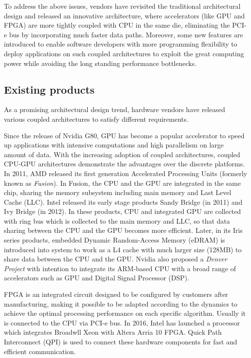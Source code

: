 To address the above issues, vendors have revisited the traditional architectural design and released an innovative architecture, where accelerators (like GPU and FPGA) are more tightly coupled with CPU in the same die, eliminating the PCI-e bus by incorporating much faster data paths. Moreover, some new features are introduced to enable software developers with more programming flexibility to deploy applications on such coupled architectures to exploit the great computing power while avoiding the long standing performance bottlenecks.

\subsection{Existing products}
As a promising architectural design trend, hardware vendors have released various coupled architectures to satisfy different requirements.

Since the release of Nvidia G80, GPU has become a popular accelerator to speed up applications with intensive computations and high parallelism on large amount of data. With the increasing adoption of coupled architectures, coupled CPU-GPU architectures demonstrate the advantages over the discrete platforms. In 2011, AMD released its first generation Accelerated Processing Units (formerly known as \textit{Fusion}). In Fusion, the CPU and the GPU are integrated in the same chip, sharing the memory subsystem including main memory and Last Level Cache (LLC). Intel released its early stage products Sandy Bridge (in 2011) and Ivy Bridge (in 2012). In these products, CPU and integrated GPU are collected with ring bus which is collected to the main memory and LLC, so that data sharing between the CPU and the GPU becomes more efficient. Later, in its Iris series products, embedded Dynamic Random-Access Memory (eDRAM) is introduced into system to work as a L4 cache with much larger size (128MB) to share data between the CPU and the GPU. Nvidia also proposed a \textit{Denver Project} with intention to integrate its ARM-based CPU with a broad range of accelerators such as GPU and Digital Signal Processor (DSP).

 FPGA is an integrated circuit designed to be configured by customers after manufacturing, making it possible to be adapted according to the dynamics to achieve the optimal processing performance on each specific algorithm. Usually it is connected to the CPU via PCI-e bus. In 2016, Intel has launched a processor which integrates Broadwll Xeon with Altera Arria 10 FPGA. Quick Path Interconnect (QPI) is used to connect these hardware components for fast and efficient communication.

